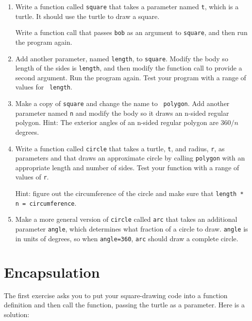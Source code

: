 \documentclass[10pt]{book}
\begin{document}
\begin{enumerate}

\item Write a function called {\tt square} that takes a parameter
named {\tt t}, which is a turtle.  It should use the turtle to draw
a square.

Write a function call that passes {\tt bob} as an argument to
{\tt square}, and then run the program again.

\item Add another parameter, named {\tt length}, to {\tt square}.
Modify the body so length of the sides is {\tt length}, and then
modify the function call to provide a second argument.  Run the
program again.  Test your program with a range of values for {\tt
length}.

\item Make a copy of {\tt square} and change the name to {\tt
  polygon}.  Add another parameter named {\tt n} and modify the body
  so it draws an n-sided regular polygon.  Hint: The exterior angles
  of an n-sided regular polygon are $360/n$ degrees.   

\item Write a function called {\tt circle} that takes a turtle,
{\tt t}, and radius, {\tt r}, as parameters and that draws an
approximate circle by calling {\tt polygon} with an appropriate
length and number of sides.  Test your function with a range of values
of {\tt r}.   

Hint: figure out the circumference of the circle and make sure that
{\tt length * n = circumference}.

\item Make a more general version of {\tt circle} called {\tt arc}
that takes an additional parameter {\tt angle}, which determines
what fraction of a circle to draw.  {\tt angle} is in units of
degrees, so when {\tt angle=360}, {\tt arc} should draw a complete
circle.

\end{enumerate}


\section{Encapsulation}

The first exercise asks you to put your square-drawing code
into a function definition and then call the function, passing
the turtle as a parameter.  Here is a solution:
\end{document}
